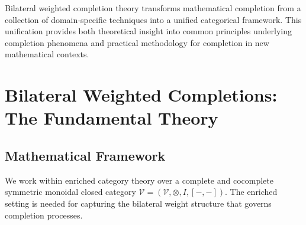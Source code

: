 \documentclass[11pt]{article}
\theoremstyle{plain}
\theoremstyle{definition}
\theoremstyle{remark}
\newcommand{\V}{\mathcal{V}}
\newcommand{\tensor}{\otimes}
\begin{document}
Bilateral weighted completion theory transforms mathematical completion from a collection of domain-specific techniques into a unified categorical framework. This unification provides both theoretical insight into common principles underlying completion phenomena and practical methodology for completion in new mathematical contexts.

\section{Bilateral Weighted Completions: The Fundamental Theory}

\subsection{Mathematical Framework}

We work within enriched category theory over a complete and cocomplete symmetric monoidal closed category $\V = (\V, \tensor, I, [-,-])$. The enriched setting is needed for capturing the bilateral weight structure that governs completion processes.
\end{document}
